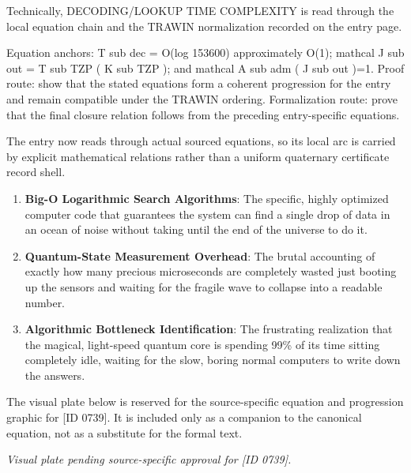 Technically, DECODING/LOOKUP TIME COMPLEXITY is read through the local equation chain and the TRAWIN normalization recorded on the entry page.

Equation anchors: T sub dec = O(log 153600) approximately O(1); mathcal J sub out = T sub TZP ( K sub TZP ); and mathcal A sub adm ( J sub out )=1. Proof route: show that the stated equations form a coherent progression for the entry and remain compatible under the TRAWIN ordering. Formalization route: prove that the final closure relation follows from the preceding entry-specific equations.

The entry now reads through actual sourced equations, so its local arc is carried by explicit mathematical relations rather than a uniform quaternary certificate record shell.
\endgroup

\begin{enumerate}[leftmargin=1.6em,itemsep=6pt,topsep=4pt]
\item \textbf{Big-O Logarithmic Search Algorithms}: The specific, highly optimized computer code that guarantees the system can find a single drop of data in an ocean of noise without taking until the end of the universe to do it.
\item \textbf{Quantum-State Measurement Overhead}: The brutal accounting of exactly how many precious microseconds are completely wasted just booting up the sensors and waiting for the fragile wave to collapse into a readable number.
\item \textbf{Algorithmic Bottleneck Identification}: The frustrating realization that the magical, light-speed quantum core is spending 99\% of its time sitting completely idle, waiting for the slow, boring normal computers to write down the answers.
\end{enumerate}

\begingroup\footnotesize\sloppy
The visual plate below is reserved for the source-specific equation and progression graphic for [ID 0739]. It is included only as a companion to the canonical equation, not as a substitute for the formal text.
\par\endgroup
\begingroup\footnotesize\itshape
Visual plate pending source-specific approval for [ID 0739].
\par\endgroup

